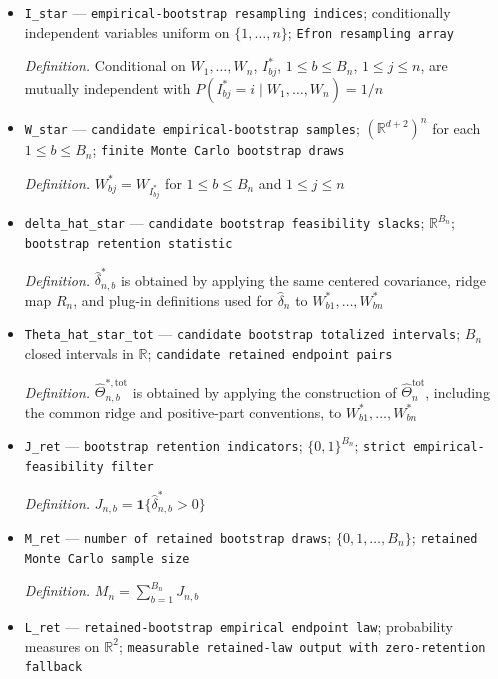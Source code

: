 \documentclass{article}
\begin{document}
\begin{itemize}
  \item \texttt{I\_\allowbreak{}star} --- \texttt{empirical-\allowbreak{}bootstrap resampling indices}; conditionally independent variables uniform on \(\{1,\ldots,n\}\); \texttt{Efron resampling array}
  \par\smallskip\noindent\emph{Definition.} Conditional on \(W_1,\ldots,W_n\), \(I_{bj}^{*}\), \(1\leq b\leq B_n\), \(1\leq j\leq n\), are mutually independent with \(P(I_{bj}^{*}=i\mid W_1,\ldots,W_n)=1/n\)
  \item \texttt{W\_\allowbreak{}star} --- \texttt{candidate empirical-\allowbreak{}bootstrap samples}; \((\mathbb R^{d+2})^n\) for each \(1\leq b\leq B_n\); \texttt{finite Monte Carlo bootstrap draws}
  \par\smallskip\noindent\emph{Definition.} \(W_{bj}^{*}=W_{I_{bj}^{*}}\) for \(1\leq b\leq B_n\) and \(1\leq j\leq n\)
  \item \texttt{delta\_\allowbreak{}hat\_\allowbreak{}star} --- \texttt{candidate bootstrap feasibility slacks}; \(\mathbb R^{B_n}\); \texttt{bootstrap retention statistic}
  \par\smallskip\noindent\emph{Definition.} \(\widehat\delta_{n,b}^{*}\) is obtained by applying the same centered covariance, ridge map \(R_n\), and plug-in definitions used for \(\widehat\delta_n\) to \(W_{b1}^{*},\ldots,W_{bn}^{*}\)
  \item \texttt{Theta\_\allowbreak{}hat\_\allowbreak{}star\_\allowbreak{}tot} --- \texttt{candidate bootstrap totalized intervals}; \(B_n\) closed intervals in \(\mathbb R\); \texttt{candidate retained endpoint pairs}
  \par\smallskip\noindent\emph{Definition.} \(\widehat\Theta_{n,b}^{*,\mathrm{tot}}\) is obtained by applying the construction of \(\widehat\Theta_n^{\mathrm{tot}}\), including the common ridge and positive-part conventions, to \(W_{b1}^{*},\ldots,W_{bn}^{*}\)
  \item \texttt{J\_\allowbreak{}ret} --- \texttt{bootstrap retention indicators}; \(\{0,1\}^{B_n}\); \texttt{strict empirical-\allowbreak{}feasibility filter}
  \par\smallskip\noindent\emph{Definition.} \(J_{n,b}=\mathbf 1\{\widehat\delta_{n,b}^{*}>0\}\)
  \item \texttt{M\_\allowbreak{}ret} --- \texttt{number of retained bootstrap draws}; \(\{0,1,\ldots,B_n\}\); \texttt{retained Monte Carlo sample size}
  \par\smallskip\noindent\emph{Definition.} \(M_n=\sum_{b=1}^{B_n}J_{n,b}\)
  \item \texttt{L\_\allowbreak{}ret} --- \texttt{retained-\allowbreak{}bootstrap empirical endpoint law}; probability measures on \(\mathbb R^2\); \texttt{measurable retained-\allowbreak{}law output with zero-\allowbreak{}retention fallback}

\end{itemize}
\end{document}
